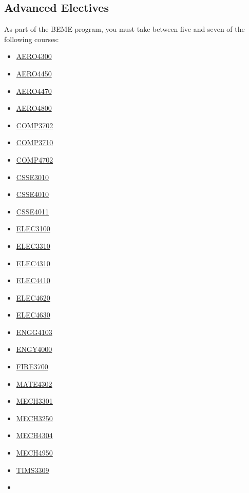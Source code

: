 \documentclass[a4paper,12pt]{report}
\begin{document}
\subsection{Advanced Electives}
As part of the BEME program, you must take between five and seven of the following courses:
\begin{multicols}{3}
    \begin{itemize}
        \item \hyperlink{AERO4300}{AERO4300}
        \item \hyperlink{AERO4450}{AERO4450}
        \item \hyperlink{AERO4470}{AERO4470}
        \item \hyperlink{AERO4800}{AERO4800}
        \item \hyperlink{COMP3702}{COMP3702}
        \item \hyperlink{COMP3710}{COMP3710}
        \item \hyperlink{COMP4702}{COMP4702}
        \item \hyperlink{CSSE3010}{CSSE3010}
        \item \hyperlink{CSSE4010}{CSSE4010}
        \item \hyperlink{CSSE4011}{CSSE4011}
        \item \hyperlink{ELEC3100}{ELEC3100}
        \item \hyperlink{ELEC3310}{ELEC3310}
        \item \hyperlink{ELEC4310}{ELEC4310}
        \item \hyperlink{ELEC4410}{ELEC4410}
        \item \hyperlink{ELEC4620}{ELEC4620}
        \item \hyperlink{ELEC4630}{ELEC4630}
        \item \hyperlink{ENGG4103}{ENGG4103}
        \item \hyperlink{ENGY4000}{ENGY4000}
        \item \hyperlink{FIRE3700}{FIRE3700}
        \item \hyperlink{MATE4302}{MATE4302}
        \item \hyperlink{MECH3301}{MECH3301}
        \item \hyperlink{MECH3250}{MECH3250}
        \item \hyperlink{MECH4304}{MECH4304}
        \item \hyperlink{MECH4950}{MECH4950}
        \item \hyperlink{TIMS3309}{TIMS3309}
        \item[]
    \end{itemize}
\end{multicols}
\end{document}
